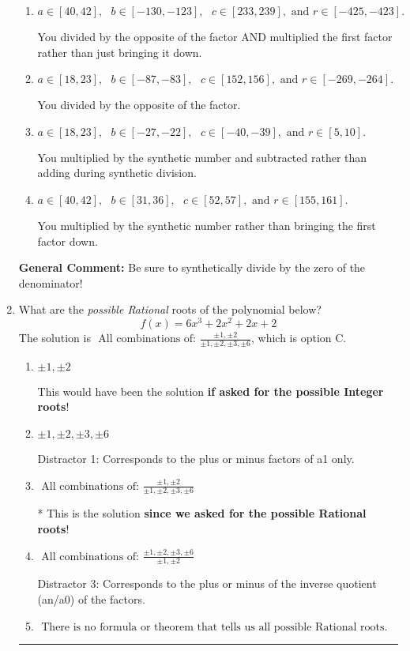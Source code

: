 \documentclass{extbook}[14pt]
\newcommand{\litem}[1]{\item #1

\rule{\textwidth}{0.4pt}}
\begin{document}
\begin{enumerate}
{\begin{enumerate}[label=\Alph*.]
* This is the solution!
\item \( a \in [40, 42], \text{   } b \in [-130, -123], \text{   } c \in [233, 239], \text{   and   } r \in [-425, -423]. \)

 You divided by the opposite of the factor AND multiplied the first factor rather than just bringing it down.
\item \( a \in [18, 23], \text{   } b \in [-87, -83], \text{   } c \in [152, 156], \text{   and   } r \in [-269, -264]. \)

 You divided by the opposite of the factor.
\item \( a \in [18, 23], \text{   } b \in [-27, -22], \text{   } c \in [-40, -39], \text{   and   } r \in [5, 10]. \)

 You multiplied by the synthetic number and subtracted rather than adding during synthetic division.
\item \( a \in [40, 42], \text{   } b \in [31, 36], \text{   } c \in [52, 57], \text{   and   } r \in [155, 161]. \)

 You multiplied by the synthetic number rather than bringing the first factor down.
\end{enumerate}

\textbf{General Comment:} Be sure to synthetically divide by the zero of the denominator!
}
\litem{
What are the \textit{possible Rational} roots of the polynomial below?
\[ f(x) = 6x^{3} +2 x^{2} +2 x + 2 \]The solution is \( \text{ All combinations of: }\frac{\pm 1,\pm 2}{\pm 1,\pm 2,\pm 3,\pm 6} \), which is option C.\begin{enumerate}[label=\Alph*.]
\item \( \pm 1,\pm 2 \)

This would have been the solution \textbf{if asked for the possible Integer roots}!
\item \( \pm 1,\pm 2,\pm 3,\pm 6 \)

 Distractor 1: Corresponds to the plus or minus factors of a1 only.
\item \( \text{ All combinations of: }\frac{\pm 1,\pm 2}{\pm 1,\pm 2,\pm 3,\pm 6} \)

* This is the solution \textbf{since we asked for the possible Rational roots}!
\item \( \text{ All combinations of: }\frac{\pm 1,\pm 2,\pm 3,\pm 6}{\pm 1,\pm 2} \)

 Distractor 3: Corresponds to the plus or minus of the inverse quotient (an/a0) of the factors. 
\item \( \text{ There is no formula or theorem that tells us all possible Rational roots.} \)


\end{enumerate}}
\end{enumerate}
\end{document}
